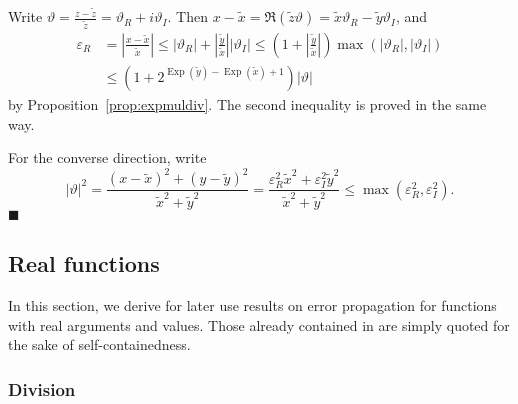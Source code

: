 \documentclass [12pt]{article}
\newcommand {\corr}[1]{{#1}}
\newcommand {\appro}[1]{\widetilde {#1}}
\DeclareMathOperator{\Exp}{\operatorname {Exp}}
\renewcommand {\epsilon}{\varepsilon}
\renewcommand {\theta}{\vartheta}
\renewcommand {\leq}{\leqslant}
\newenvironment{proof}{\noindent{\bf Proof:}}{{\hspace* {\fill}$\blacksquare$}}
\begin{document}
\begin {proof}
Write $\theta = \frac {\corr z - \appro z}{\appro z}
= \theta_R + i \theta_I$. Then
$\corr x - \appro x = \Re (\appro z \theta)
= \appro x \theta_R - \appro y \theta_I$, and
\begin {align*}
\epsilon_R
&= \left| \frac {\corr x - \appro x}{\appro x} \right|
\leq |\theta_R| + \left| \frac {\appro y}{\appro x} \right| |\theta_I|
\leq \left( 1 + \left| \frac {\appro y}{\appro x} \right| \right)
\max (|\theta_R|, |\theta_I|) \\
&\leq \left( 1 + 2^{\Exp (\appro y) - \Exp (\appro x) + 1} \right)
|\theta|
\end {align*}
by Proposition~\ref {prop:expmuldiv}. The second inequality is proved
in the same way.

For the converse direction, write
\[
|\theta|^2
= \frac {(\corr x - \appro x)^2 + (\corr y - \appro y)^2}{\appro x^2 + \appro y^2}
= \frac {\epsilon_R^2 \appro x^2 + \epsilon_I^2 \appro y^2}{\appro x^2 + \appro y^2}
\leq \max \left( \epsilon_R^2, \epsilon_I^2 \right).
\]
\end {proof}


\subsection {Real functions}

In this section, we derive for later use results on error propagation for
functions with real arguments and values. Those already contained in
\cite{MPFRAlgorithms} are simply quoted for the sake of self-containedness.



\subsubsection {Division}
\label {sssec:proprealdiv}
\end{document}
